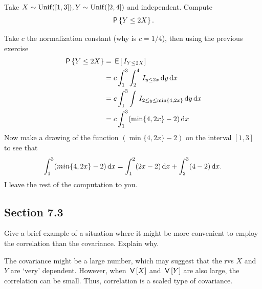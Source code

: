 \begin{exercise}\label{ex:2a}
Take $X\sim\mathrm{Unif}([1,3]), Y\sim\mathrm{Unif}([2,4])$ and independent. Compute
\begin{equation}
  \label{eq:824}
\P{Y\leq 2X}.
\end{equation}
\begin{solution}
Take $c$ the normalization constant (why is $c=1/4$), then using the previous exercise
\begin{align}
\,\mathsf{P}\left\{Y\leq 2X\right\}
&=\,\mathsf{E}\left[\,I_{Y\leq 2X}\right] \\
&=c \int_{1}^{3}\int_{2}^{4} \,I_{y\leq 2x} \,\textrm{d}y \,\textrm{d}x \\
&=c \int_{1}^{3}\int \,I_{2\leq y\leq \min\{4,2x\}}  \,\textrm{d}y \,\textrm{d}x \\
&=c \int_{1}^{3} (\min\{4, 2x\} -2) \,\textrm{d}x
\end{align}
Now make a drawing of the function $(\min\{4, 2x\} - 2)$ on the interval $[1,3]$ to see that
\begin{equation}
\int_{1}^{3} (min\{4, 2x\} -2) \,\textrm{d}x = \int_{1}^{2} (2x -2) \,\textrm{d}x + \int_{2}^{3} (4 -2) \,\textrm{d}x.
\end{equation}
I leave the rest of the computation to you.
\end{solution}
\end{exercise}


\subsection*{Section 7.3}
\label{sec:section-7.3}



\begin{exercise}
Give a brief example of a situation where it might be more convenient to employ the correlation than the covariance.  Explain why.
\begin{solution}
The covariance might be a large number, which may  suggest that the rvs $X$ and $Y$ are `very' dependent. However, when $\,\mathsf{V}\left[X\right]$ and $\,\mathsf{V}\left[Y\right]$ are also large, the correlation can be small. Thus, correlation is a scaled type of covariance.
\end{solution}
\end{exercise}

